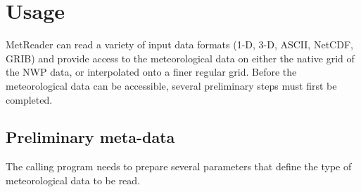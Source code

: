 \documentclass[11pt]{article}   %
\begin{document}
\clearpage
\section{Usage}
MetReader can read a variety of input data formats (1-D, 3-D, ASCII, NetCDF, GRIB) and
provide access to the meteorological data on either the native grid of the NWP data, or interpolated
onto a finer regular grid.  Before the meteorological data can be accessible, several preliminary steps
must first be completed.
\subsection{Preliminary meta-data}\label{SSecPrelimMetaData}
The calling program needs to prepare several parameters that define the type of meteorological
data to be read.  
\end{document}
